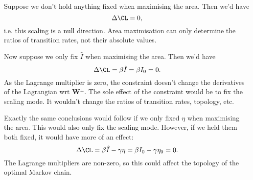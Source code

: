\documentclass[12pt]{article}
\newcommand{\W}{\mathbf{W}}
\begin{document}
Suppose we don't hold anything fixed when maximising the area. Then we'd have
%
\begin{equation*}
  \Delta \CL = 0,
\end{equation*}
%
i.e. this scaling is a null direction. Area maximisation can only determine the ratios of transition rates, not their absolute values.

Now suppose we only fix $\hat{I}$ when maximising the area. Then we'd have
%
\begin{equation*}
  \Delta \CL = \beta \hat{I} = \beta I_0 = 0.
\end{equation*}
%
As the Lagrange multiplier is zero, the constraint doesn't change the derivatives of the Lagrangian wrt $\W^\pm$. The sole effect of the constraint would be to fix the scaling mode. It wouldn't change the ratios of transition rates, topology, etc.

Exactly the same conclusions would follow if we only fixed $\eta$ when maximising the area. This would also only fix the scaling mode. However, if we held them both fixed, it would have more of an effect:
%
\begin{equation}\label{eq:scaleconstr}
  \Delta \CL = \beta \hat{I} - \gamma \eta = \beta I_0 - \gamma \eta_0 = 0.
\end{equation}
%
The Lagrange multipliers are non-zero, so this could affect the topology of the optimal Markov chain.













\end{document}
